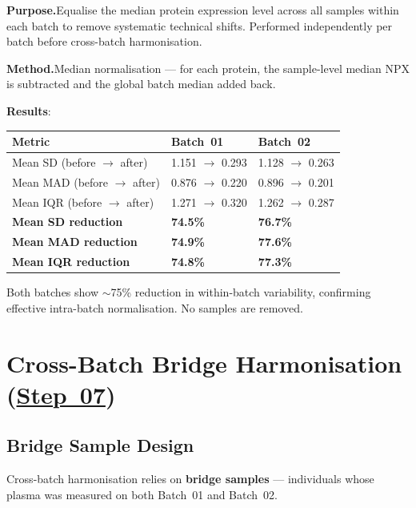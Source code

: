 \documentclass[11pt,a4paper]{article}
\begin{document}
\textbf{Purpose.}\enspace Equalise the median protein expression level
across all samples within each batch to remove systematic technical shifts.
Performed independently per batch before cross-batch harmonisation.

\textbf{Method.}\enspace Median normalisation --- for each protein, the
sample-level median NPX is subtracted and the global batch median added
back.

\textbf{Results}:

{\footnotesize
\renewcommand{\arraystretch}{1.2}
\begin{longtable}{p{5cm}p{3.2cm}p{3.2cm}}
\toprule
\textbf{Metric} & \textbf{Batch~01} & \textbf{Batch~02} \\
\midrule
Mean SD (before $\to$ after)  & 1.151 $\to$ 0.293 & 1.128 $\to$ 0.263 \\
Mean MAD (before $\to$ after) & 0.876 $\to$ 0.220 & 0.896 $\to$ 0.201 \\
Mean IQR (before $\to$ after) & 1.271 $\to$ 0.320 & 1.262 $\to$ 0.287 \\
\textbf{Mean SD reduction}  & \textbf{74.5\%} & \textbf{76.7\%} \\
\textbf{Mean MAD reduction} & \textbf{74.9\%} & \textbf{77.6\%} \\
\textbf{Mean IQR reduction} & \textbf{74.8\%} & \textbf{77.3\%} \\
\bottomrule
\end{longtable}
\renewcommand{\arraystretch}{1.0}
}

Both batches show $\sim$75\% reduction in within-batch variability,
confirming effective intra-batch normalisation. No samples are removed.

\section{Cross-Batch Bridge Harmonisation (\href{https://github.com/FINNGEN/FinnGen3-proteomics-pipeline#pipeline-steps}{Step~07})}

\subsection{Bridge Sample Design}

Cross-batch harmonisation relies on \textbf{bridge samples} --- individuals
whose plasma was measured on both Batch~01 and Batch~02.
\end{document}
